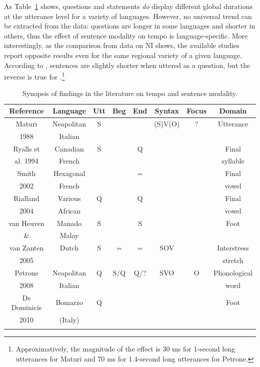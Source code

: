 As Table~\ref{tab41} shows, questions and statements \textit{do} display different global durations at the utterance level for a variety of languages. However, no universal trend can be extracted from the data: questions are longer in some languages and shorter in others, thus the effect of sentence modality on tempo is language-specific. More interestingly, as the comparison from data on NI shows, the available studies report opposite results even for the same regional variety of a given language. According to \citet[table 6]{maturi1988intonazione}, sentences are slightly shorter when uttered as a question, but the reverse is true for \citet[163]{petrone2008role}.\footnote{Approximatively, the magnitude of the effect is 30 ms for 1-second long utterances for Maturi and 70 ms for 1.4-second long utterances for Petrone.} 

\begin{landscape}
\begin{table}[p]
\centering
\begin{tabular}{c c c c c c c c}
\mytoprule
Reference & Language & Utt & Beg & End & Syntax & Focus & Domain \\
\midrule\midrule
Maturi & Neapolitan & S & & & (S)V(O) & ? & Utterance\\
1988 & Italian & & & & & & \\
\midrule
Ryalls et & Canadian & S & & Q & & & Final \\
al. 1994 & French & & & & & & syllable \\
\midrule
Smith & Hexagonal & & & = & & & Final \\
2002 & French & & & & & & vowel \\
\midrule
Rialland & Various & Q & & Q & & & Final \\
2004 & African & & & & & & vowel \\
\midrule
van Heuven & Manado & S & & S & & & Foot \\
\& & Malay & & & & & & \\
van Zanten & Dutch & S & = & = & SOV & & Interstress \\
2005 & & & & & & & stretch \\
\midrule
Petrone & Neapolitan & Q & S/Q & Q/? & SVO & O & Phonological \\
2008 & Italian & & & & & & word \\
\midrule
De Dominicis & Bomarzo & Q & & & & & Foot \\
2010 & (Italy) & & & & & & \\
\mybottomrule
\end{tabular}
\caption{Synopsis of findings in the literature on tempo and sentence modality.}
\label{tab41}\end{table}
\end{landscape}


